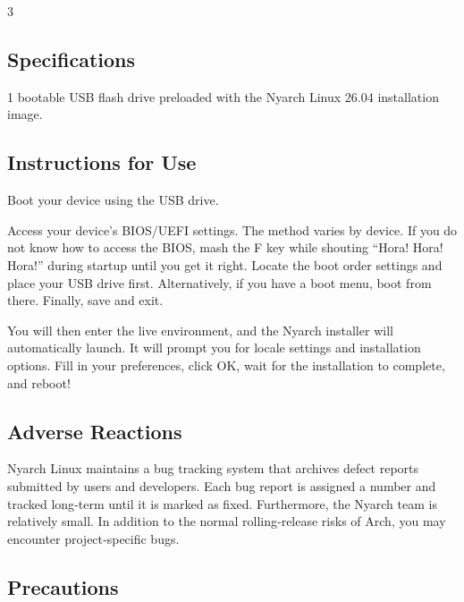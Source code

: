 \documentclass{article}
\begin{document}
\begin{multicols*}{3}
	\begin{tcolorbox}
	\section*{Specifications}
	\end{tcolorbox}

	1 bootable USB flash drive preloaded with the Nyarch Linux 26.04 installation image.

	\medskip

	\begin{tcolorbox}
	\section*{Instructions for Use}
	\end{tcolorbox}

	Boot your device using the USB drive.

	Access your device's BIOS/UEFI settings. The method varies by device. If you do not know how to access the BIOS, mash the F key while shouting “Hora! Hora! Hora!” during startup until you get it right.
	Locate the boot order settings and place your USB drive first. Alternatively, if you have a boot menu, boot from there. Finally, save and exit.

	You will then enter the live environment, and the Nyarch installer will automatically launch. It will prompt you for locale settings and installation options. Fill in your preferences, click OK, wait for the installation to complete, and reboot!

	\medskip	

	\begin{tcolorbox}
	\section*{Adverse Reactions}
	\end{tcolorbox}

	Nyarch Linux maintains a bug tracking system that archives defect reports submitted by users and developers. Each bug report is assigned a number and tracked long‑term until it is marked as fixed.
	Furthermore, the Nyarch team is relatively small. In addition to the normal rolling‑release risks of Arch, you may encounter project‑specific bugs.

	\medskip


	\begin{tcolorbox}
	\section*{Precautions}
	\end{tcolorbox}
	\begin{itemize}[leftmargin=*]


\end{itemize}
\end{multicols*}
\end{document}
